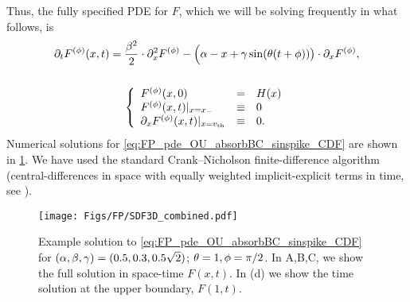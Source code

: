 Thus, the fully specified PDE for $F$, which we will be solving frequently in what
follows, is
\begin{equation}
\begin{gathered}
	{\partial}_t F^{(\phi)}(x,t) =
					\frac{\beta^2 }{2}\cdot {\partial}^2_x F^{(\phi)} -  
					\Big(\alpha- x + {\gamma } \sin({ \theta} (t + \phi))\big)  \cdot {\partial}_x F^{(\phi)},
	\\
	\\
	\left\{ \begin{array}{lcl}
	 F^{(\phi)}(x,0) &=& H(x)
	\\
	F^{(\phi)}(x,t) |_{x={ x_{-} }} &\equiv& 0 
	\\
	{\partial}_x F^{(\phi)}(x,t) |_{x={ v_{\textrm{th} } }} &\equiv& 0.
	\end{array} \right.
\label{eq:FP_pde_OU_absorbBC_sinspike_CDF}
\end{gathered}
\end{equation}
Numerical solutions for \cref{eq:FP_pde_OU_absorbBC_sinspike_CDF} are shown in
\cref{fig:FP_pde_OU_absorbBC_CDF}. We have used the standard Crank--Nicholson
finite-difference algorithm (central-differences in space with equally weighted
implicit-explicit terms in time, see \cite{Karniadakis2003}). 

\begin{figure}[h]
\begin{center}
\texttt{[image: Figs/FP/SDF3D\_combined.pdf]} 
\caption[Transition distribution example solution]{Example solution to
\cref{eq:FP_pde_OU_absorbBC_sinspike_CDF} for $(\alpha,\beta,{\gamma }) = (0.5, 0.3, 0.5\sqrt{2})$; ${ \theta}= 1, \phi = \pi / 2$.
In A,B,C, we show the full solution in space-time $F(x,t)$. In (d) we show
the time solution at the upper boundary, $F(1,t)$.} 
\label{fig:FP_pde_OU_absorbBC_CDF} 
\end{center}
\end{figure}

